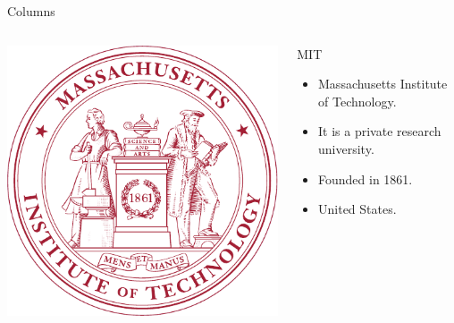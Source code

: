 \documentclass[red]{beamer}
\begin{document}
\begin{frame}{Columns}
\begin{columns}
\begin{column}[c]{0.25\textwidth}
\begin{block}{}
\includegraphics[width=\textwidth]{mit}
\end{block}
\end{column}
\begin{column}[c]{0.55\textwidth}
\begin{block}{MIT}
\begin{itemize}
\item Massachusetts Institute of Technology.
\item It is a private research university.
\item Founded in 1861.
\item United States.
\end{itemize}
\end{block}
\end{column}
\end{columns}
\end{frame}
\end{document}
